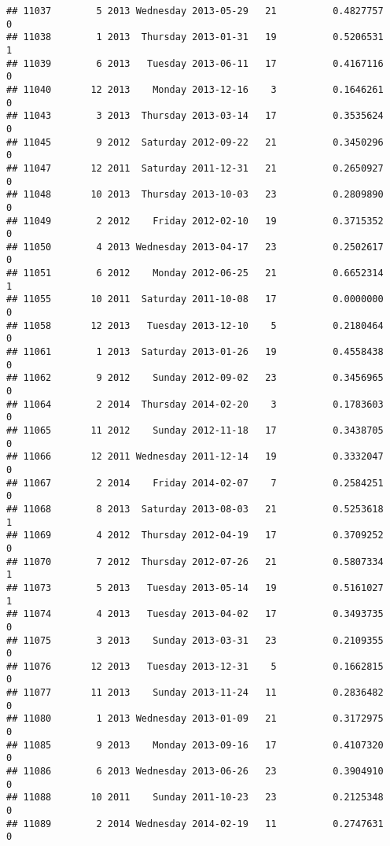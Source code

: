 \documentclass[
]{article}
\begin{document}
\begin{verbatim}
## 11037        5 2013 Wednesday 2013-05-29   21          0.4827757             0
## 11038        1 2013  Thursday 2013-01-31   19          0.5206531             1
## 11039        6 2013   Tuesday 2013-06-11   17          0.4167116             0
## 11040       12 2013    Monday 2013-12-16    3          0.1646261             0
## 11043        3 2013  Thursday 2013-03-14   17          0.3535624             0
## 11045        9 2012  Saturday 2012-09-22   21          0.3450296             0
## 11047       12 2011  Saturday 2011-12-31   21          0.2650927             0
## 11048       10 2013  Thursday 2013-10-03   23          0.2809890             0
## 11049        2 2012    Friday 2012-02-10   19          0.3715352             0
## 11050        4 2013 Wednesday 2013-04-17   23          0.2502617             0
## 11051        6 2012    Monday 2012-06-25   21          0.6652314             1
## 11055       10 2011  Saturday 2011-10-08   17          0.0000000             0
## 11058       12 2013   Tuesday 2013-12-10    5          0.2180464             0
## 11061        1 2013  Saturday 2013-01-26   19          0.4558438             0
## 11062        9 2012    Sunday 2012-09-02   23          0.3456965             0
## 11064        2 2014  Thursday 2014-02-20    3          0.1783603             0
## 11065       11 2012    Sunday 2012-11-18   17          0.3438705             0
## 11066       12 2011 Wednesday 2011-12-14   19          0.3332047             0
## 11067        2 2014    Friday 2014-02-07    7          0.2584251             0
## 11068        8 2013  Saturday 2013-08-03   21          0.5253618             1
## 11069        4 2012  Thursday 2012-04-19   17          0.3709252             0
## 11070        7 2012  Thursday 2012-07-26   21          0.5807334             1
## 11073        5 2013   Tuesday 2013-05-14   19          0.5161027             1
## 11074        4 2013   Tuesday 2013-04-02   17          0.3493735             0
## 11075        3 2013    Sunday 2013-03-31   23          0.2109355             0
## 11076       12 2013   Tuesday 2013-12-31    5          0.1662815             0
## 11077       11 2013    Sunday 2013-11-24   11          0.2836482             0
## 11080        1 2013 Wednesday 2013-01-09   21          0.3172975             0
## 11085        9 2013    Monday 2013-09-16   17          0.4107320             0
## 11086        6 2013 Wednesday 2013-06-26   23          0.3904910             0
## 11088       10 2011    Sunday 2011-10-23   23          0.2125348             0
## 11089        2 2014 Wednesday 2014-02-19   11          0.2747631             0

\end{verbatim}
\end{document}
